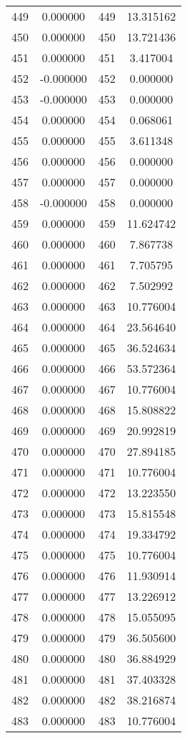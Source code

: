 \documentclass[12pt]{article}
\begin{document}
\begin{longtable}{@{}cccc@{}}
449 & 0.000000 & 449 & 13.315162 \\
450 & 0.000000 & 450 & 13.721436 \\
451 & 0.000000 & 451 & 3.417004 \\
452 & -0.000000 & 452 & 0.000000 \\
453 & -0.000000 & 453 & 0.000000 \\
454 & 0.000000 & 454 & 0.068061 \\
455 & 0.000000 & 455 & 3.611348 \\
456 & 0.000000 & 456 & 0.000000 \\
457 & 0.000000 & 457 & 0.000000 \\
458 & -0.000000 & 458 & 0.000000 \\
459 & 0.000000 & 459 & 11.624742 \\
460 & 0.000000 & 460 & 7.867738 \\
461 & 0.000000 & 461 & 7.705795 \\
462 & 0.000000 & 462 & 7.502992 \\
463 & 0.000000 & 463 & 10.776004 \\
464 & 0.000000 & 464 & 23.564640 \\
465 & 0.000000 & 465 & 36.524634 \\
466 & 0.000000 & 466 & 53.572364 \\
467 & 0.000000 & 467 & 10.776004 \\
468 & 0.000000 & 468 & 15.808822 \\
469 & 0.000000 & 469 & 20.992819 \\
470 & 0.000000 & 470 & 27.894185 \\
471 & 0.000000 & 471 & 10.776004 \\
472 & 0.000000 & 472 & 13.223550 \\
473 & 0.000000 & 473 & 15.815548 \\
474 & 0.000000 & 474 & 19.334792 \\
475 & 0.000000 & 475 & 10.776004 \\
476 & 0.000000 & 476 & 11.930914 \\
477 & 0.000000 & 477 & 13.226912 \\
478 & 0.000000 & 478 & 15.055095 \\
479 & 0.000000 & 479 & 36.505600 \\
480 & 0.000000 & 480 & 36.884929 \\
481 & 0.000000 & 481 & 37.403328 \\
482 & 0.000000 & 482 & 38.216874 \\
483 & 0.000000 & 483 & 10.776004 \\

\end{longtable}
\end{document}
